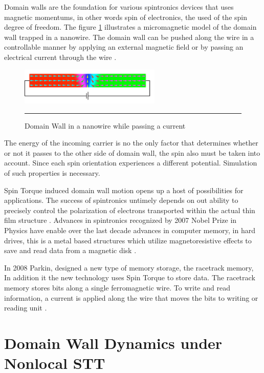 Domain walls are the foundation for various spintronics devices that uses magnetic momentums, in other words spin of electronics, the used of the spin degree of freedom. The figure \ref{fig:DWspin} illustrates a micromagnetic model of the domain wall trapped in a nanowire. The domain wall can be pushed along the wire in a controllable manner by applying an external magnetic field or by passing an electrical current through the wire \cite{dwwire}.

\begin{figure}[htbp]
	\centering
		\includegraphics[width=0.6\textwidth]{Figures/DWspin.png}
		\rule{35em}{0.52pt}
	\caption[Domain Wall nanowire]{Domain Wall in a nanowire while passing a current}
	\label{fig:DWspin}
\end{figure}

The energy of the incoming  carrier is no the only factor that determines whether or not it passes to the other side of domain wall, the spin also must be taken into account. Since each spin orientation experiences a different potential. Simulation of such properties is necessary.

Spin Torque induced domain wall motion opens up a host of possibilities for applications. The success of spintronics untimely depends on out ability to precisely  control the polarization of electrons transported within the actual thin film structure \cite{ferro}. Advances in spintronics recognized by 2007 Nobel Prize in Physics have enable over the last decade advances in computer memory, in hard drives, this is a metal based structures which utilize magnetoresistive effects to save and read data from a magnetic disk \cite{handbookspin}.

 In 2008 Parkin, designed a new type of memory storage, the racetrack memory, In addition it the new technology uses Spin Torque to store data. The racetrack memory stores bits along a single ferromagnetic wire. To write and read information, a current is applied along the wire that moves the bits to writing or reading unit \cite{racetrack}.
 
\section{Domain Wall Dynamics under Nonlocal STT}

